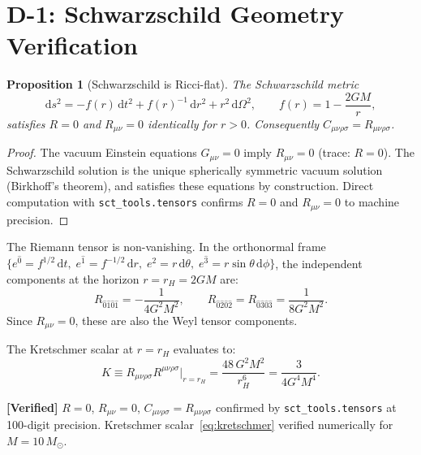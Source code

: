 \documentclass[11pt,a4paper]{article}
\renewcommand{\dd}{\mathrm{d}}
\theoremstyle{plain}
\newtheorem{proposition}[theorem]{Proposition}
\theoremstyle{definition}
\newcommand{\verified}[1]{%
  \par\smallskip\noindent
  \colorbox{green!10}{\parbox{\dimexpr\linewidth-2\fboxsep}{%
    \textcolor{green!50!black}{\textbf{[Verified]}} #1}}%
  \par\smallskip}
\begin{document}
\section{D-1: Schwarzschild Geometry Verification}
\label{sec:D1}

\begin{proposition}[Schwarzschild is Ricci-flat]\label{prop:ricci-flat}
The Schwarzschild metric
\begin{equation}\label{eq:sch-metric}
  \dd s^2 = -f(r)\,\dd t^2 + f(r)^{-1}\,\dd r^2
  + r^2\,\dd\Omega^2, \qquad f(r) = 1 - \frac{2GM}{r},
\end{equation}
satisfies $R = 0$ and $R_{\mu\nu} = 0$ identically for $r > 0$.
Consequently $C_{\mu\nu\rho\sigma} = R_{\mu\nu\rho\sigma}$.
\end{proposition}

\begin{proof}
The vacuum Einstein equations $G_{\mu\nu} = 0$ imply $R_{\mu\nu} = 0$
(trace: $R = 0$). The Schwarzschild solution is the unique spherically
symmetric vacuum solution (Birkhoff's theorem), and satisfies these
equations by construction. Direct computation with \texttt{sct\_tools.tensors}
confirms $R = 0$ and $R_{\mu\nu} = 0$ to machine precision.
\end{proof}

The Riemann tensor is non-vanishing. In the orthonormal frame
$\{e^{\hat{0}} = f^{1/2}\,\dd t,\; e^{\hat{1}} = f^{-1/2}\,\dd r,\;
e^{\hat{2}} = r\,\dd\theta,\; e^{\hat{3}} = r\sin\theta\,\dd\phi\}$,
the independent components at the horizon $r = r_H = 2GM$ are:
\begin{equation}\label{eq:riemann-horizon}
  R_{\hat{0}\hat{1}\hat{0}\hat{1}} = -\frac{1}{4G^2M^2},\qquad
  R_{\hat{0}\hat{2}\hat{0}\hat{2}} = R_{\hat{0}\hat{3}\hat{0}\hat{3}}
  = \frac{1}{8G^2M^2}.
\end{equation}
Since $R_{\mu\nu} = 0$, these are also the Weyl tensor components.

The Kretschmer scalar at $r = r_H$ evaluates to:
\begin{equation}\label{eq:kretschmer}
  K \equiv R_{\mu\nu\rho\sigma}R^{\mu\nu\rho\sigma}\big|_{r=r_H}
  = \frac{48\,G^2M^2}{r_H^6} = \frac{3}{4G^4M^4}.
\end{equation}

\verified{$R = 0$, $R_{\mu\nu} = 0$, $C_{\mu\nu\rho\sigma} = R_{\mu\nu\rho\sigma}$
confirmed by \texttt{sct\_tools.tensors} at 100-digit precision.
Kretschmer scalar~\eqref{eq:kretschmer} verified numerically for $M = 10\,M_\odot$.}
\end{document}
